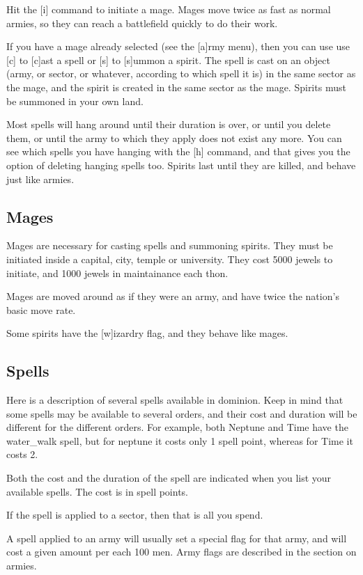 Hit the [i] command to initiate a mage.  Mages move twice as fast as
normal armies, so they can reach a battlefield quickly to do their
work.

If you have a mage already selected (see the [a]rmy menu), then you
can use use [c] to [c]ast a spell or [s] to [s]ummon a spirit.  The
spell is cast on an object (army, or sector, or whatever, according to
which spell it is) in the same sector as the mage, and the spirit is
created in the same sector as the mage.  Spirits must be summoned in
your own land.

Most spells will hang around until their duration is over, or until
you delete them, or until the army to which they apply does not exist
any more.  You can see which spells you have hanging with the [h]
command, and that gives you the option of deleting hanging spells too.
Spirits last until they are killed, and behave just like armies.

\subsection{Mages}
Mages are necessary for casting spells and summoning spirits.  They
must be initiated inside a capital, city, temple or university.  They
cost 5000 jewels to initiate, and 1000 jewels in maintainance each
thon.

Mages are moved around as if they were an army, and have twice the
nation's basic move rate.

Some spirits have the [w]izardry flag, and they behave like mages.

\subsection{Spells}
Here is a description of several spells available in dominion.  Keep
in mind that some spells may be available to several orders, and their
cost and duration will be different for the different orders.  For
example, both Neptune and Time have the water_walk spell, but for
neptune it costs only 1 spell point, whereas for Time it costs 2.

Both the cost and the duration of the spell are indicated when you
list your available spells.  The cost is in spell points.

If the spell is applied to a sector, then that is all you spend.

A spell applied to an army will usually set a special flag for that
army, and will cost a given amount per each 100 men.  Army flags are
described in the section on armies.

